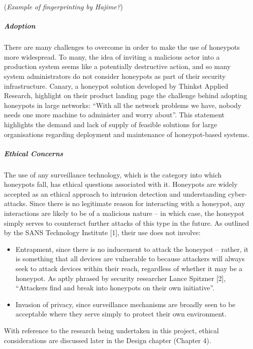 {	(\textit{Example of fingerprinting by Hajime?})

	\subparagraph{Adoption}
	There are many challenges to overcome in order to make the use of honeypots more widespread. To many, the idea of inviting a malicious actor into a production system seems like a potentially destructive action, and so many system administrators do not consider honeypots as part of their security infrastructure. Canary, a honeypot solution developed by Thinkst Applied Research,  highlight on their product landing page the challenge behind adopting honeypots in large networks: “With all the network problems we have, nobody needs one more machine to administer and worry about”. This statement highlights the demand and lack of supply of feasible solutions for large organisations regarding deployment and maintenance of honeypot-based systems. 
	
	\subparagraph{Ethical Concerns}
 	The use of any surveillance technology, which is the category into which honeypots fall, has ethical questions associated with it. Honeypots are widely accepted as an ethical approach to intrusion detection and understanding cyber-attacks. Since there is no legitimate reason for interacting with a honeypot, any interactions are likely to be of a malicious nature – in	which case, the honeypot simply serves to counteract further attacks of this type in the	future. As outlined by the SANS Technology Institute [1], their use does not involve:
 	
 	\begin{itemize}

 		\item Entrapment, since there is no inducement to attack the honeypot – rather, it is	something that all devices are vulnerable to because attackers will always seek to attack devices within their reach, regardless of whether it may be a honeypot. As aptly phrased by security researcher Lance Spitzner [2], “Attackers find and break into honeypots on their own initiative”.
 	
 		\item Invasion of privacy, since surveillance mechanisms are broadly seen to be acceptable where they serve simply to protect their own environment.
 		
	\end{itemize}

	With reference to the research being undertaken in this project, ethical considerations are discussed later in the Design chapter (Chapter 4).


}
